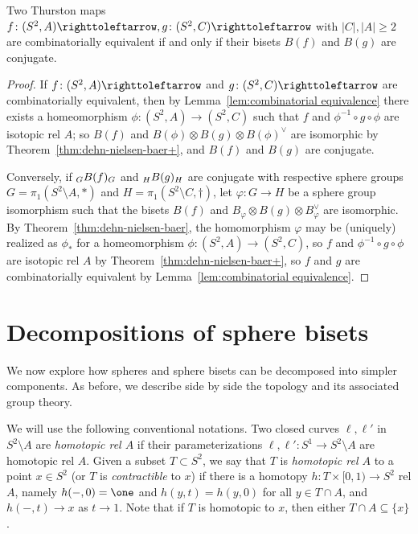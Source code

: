 \documentclass{amsart}
\begin{document}
\begin{cor}\label{cor:kameyama}
  Two Thurston maps $f\colon (S^2,A)\selfmap,g\colon (S^2,C)\selfmap$ with $|C|,|A|\ge 2$ are combinatorially equivalent if and only
  if their bisets $B(f)$ and $B(g)$ are conjugate.
\end{cor}
\begin{proof}
  If $f\colon(S^2,A)\selfmap$ and $g\colon(S^2,C)\selfmap$ are
  combinatorially equivalent, then by Lemma~\ref{lem:combinatorial
    equivalence} there exists a homeomorphism
  $\phi\colon(S^2,A)\to(S^2,C)$ such that $f$ and
  $\phi^{-1}\circ g\circ\phi$ are isotopic rel $A$; so $B(f)$ and
  $B(\phi)\otimes B(g)\otimes B(\phi)^\vee$ are isomorphic by
  Theorem~\ref{thm:dehn-nielsen-baer+}, and $B(f)$ and $B(g)$ are
  conjugate.

  Conversely, if $\subscript G B(f)_G$ and $\subscript H B(g)_H$ are
  conjugate with respective sphere groups $G=\pi_1(S^2\setminus A,*)$
  and $H=\pi_1(S^2\setminus C,\dagger)$, let $\varphi\colon G\to H$ be
  a sphere group isomorphism such that the bisets $B(f)$ and
  $B_\varphi\otimes B(g)\otimes B_\varphi^\vee$ are isomorphic. By
  Theorem~\ref{thm:dehn-nielsen-baer}, the homomorphism $\varphi$ may
  be (uniquely) realized as $\phi_*$ for a homeomorphism
  $\phi\colon(S^2,A)\to(S^2,C)$, so $f$ and
  $\phi^{-1}\circ g\circ\phi$ are isotopic rel $A$ by
  Theorem~\ref{thm:dehn-nielsen-baer+}, so $f$ and $g$ are
  combinatorially equivalent by Lemma~\ref{lem:combinatorial
    equivalence}.
\end{proof}

\section{Decompositions of sphere bisets}
\label{s:DecSphBis}
We now explore how spheres and sphere bisets can be decomposed into
simpler components. As before, we describe side by side the topology
and its associated group theory.

We will use the following conventional notations. Two closed curves
$\ell,\ell'$ in $S^2\setminus A$ are \emph{homotopic rel $A$} if their
parameterizations $\ell,\ell'\colon S^1\to S^2\setminus A$ are
homotopic rel $A$. Given a subset $T\subset S^2$, we say that $T$ is
\emph{homotopic rel $A$} to a point $x\in S^2$ (or $T$ is
\emph{contractible} to $x$) if there is a homotopy
$h\colon T\times [0,1)\to S^2$ rel $A$, namely $h(-,0)=\one$ and
$h(y,t)=h(y,0)$ for all $y\in T\cap A$, and $h(-,t)\to x$ as $t\to
1$. Note that if $T$ is homotopic to $x$, then either
$T\cap A\subseteq\{x\}$.
\end{document}
